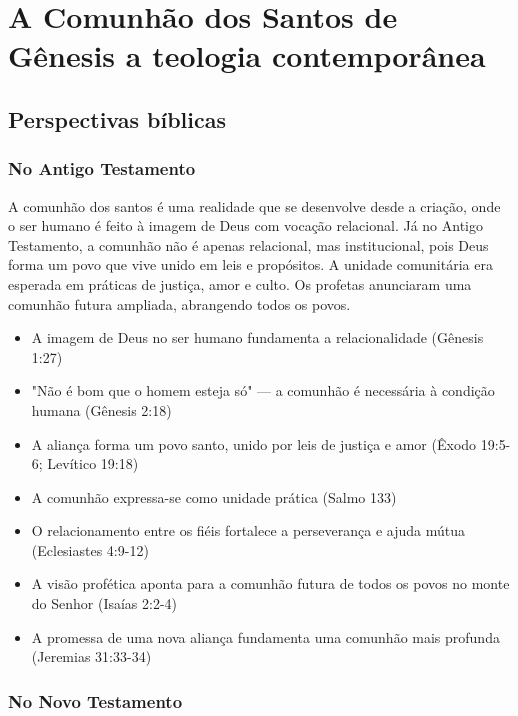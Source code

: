 \newpage
\section{A Comunhão dos Santos de Gênesis a teologia contemporânea}

\subsection{Perspectivas bíblicas}

\subsubsection{No Antigo Testamento}
A comunhão dos santos é uma realidade que se desenvolve desde a criação, onde o ser humano é feito à imagem de Deus com vocação relacional. Já no Antigo Testamento, a comunhão não é apenas relacional, mas institucional, pois Deus forma um povo que vive unido em leis e propósitos. A unidade comunitária era esperada em práticas de justiça, amor e culto. Os profetas anunciaram uma comunhão futura ampliada, abrangendo todos os povos.

\begin{itemize}
\item A imagem de Deus no ser humano fundamenta a relacionalidade (Gênesis 1:27)
\item "Não é bom que o homem esteja só" — a comunhão é necessária à condição humana (Gênesis 2:18)
\item A aliança forma um povo santo, unido por leis de justiça e amor (Êxodo 19:5-6; Levítico 19:18)
\item A comunhão expressa-se como unidade prática (Salmo 133)
\item O relacionamento entre os fiéis fortalece a perseverança e ajuda mútua (Eclesiastes 4:9-12)
\item A visão profética aponta para a comunhão futura de todos os povos no monte do Senhor (Isaías 2:2-4)
\item A promessa de uma nova aliança fundamenta uma comunhão mais profunda (Jeremias 31:33-34)
\end{itemize}

\subsubsection{No Novo Testamento}

